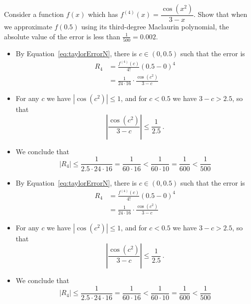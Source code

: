 




\begin{Mquestion}[2015Q]
Consider a function $f(x)$ which has $f^{(4)}(x)=\dfrac{\cos(x^2)}{3-x}$.  Show
that when we approximate $f(0.5)$ using its third-degree Maclaurin polynomial,
the absolute value of the error is less than $\frac{1}{500}=0.002$.
\end{Mquestion}
\begin{answer}
\begin{itemize}
 \item By Equation~\ref*{eq:taylorErrorN}, there is $c\in(0,0.5)$ such
that the error is
\begin{align*}
  R_4 &= \frac{f^{(4)}(c)}{4!} (0.5-0)^4 \\
      &= \frac{1}{24\cdot 16} \cdot \frac{\cos(c^2)}{3-c}
\end{align*}

\item For any $c$ we have $|\cos(c^2)| \leq 1$, and for $c<0.5$ we have
$3-c>2.5$,
so that $$\left|\frac{\cos(c^2)}{3-c}\right| \leq \frac{1}{2.5}\,.$$

\item We conclude that
$$ \left| R_4 \right| \leq \frac{1}{2.5\cdot 24\cdot 16} = \frac{1}{60\cdot 16}<\frac{1}{60\cdot 10}=\frac{1}{600}<\frac{1}{500}$$
\end{itemize}
\end{answer}
\begin{solution}
\begin{itemize}
 \item By Equation~\ref*{eq:taylorErrorN}, there is $c\in(0,0.5)$ such
that the error is
\begin{align*}
  R_4 &= \frac{f^{(4)}(c)}{4!} (0.5-0)^4 \\
      &= \frac{1}{24\cdot 16} \cdot \frac{\cos(c^2)}{3-c}
\end{align*}

\item For any $c$ we have $|\cos(c^2)| \leq 1$, and for $c<0.5$ we have
$3-c>2.5$,
so that $$\left|\frac{\cos(c^2)}{3-c}\right| \leq \frac{1}{2.5}\,.$$

\item We conclude that
$$ \left| R_4 \right| \leq \frac{1}{2.5\cdot 24\cdot 16} = \frac{1}{60\cdot 16}<\frac{1}{60\cdot 10}=\frac{1}{600}<\frac{1}{500}$$
\end{itemize}
\end{solution}



